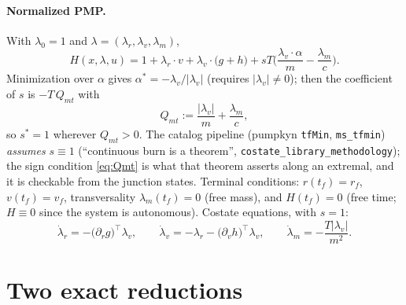 \documentclass[11pt]{article}
\theoremstyle{definition}
\newcommand{\lv}{\lambda_v}
\newcommand{\lr}{\lambda_r}
\newcommand{\lm}{\lambda_m}
\newcommand{\tf}{t_f}
\begin{document}
\paragraph{Normalized PMP.} With $\lambda_0=1$ and $\lambda=(\lr,\lv,\lm)$,
\begin{equation}\label{eq:H}
H(x,\lambda,u)=1+\lr\!\cdot v+\lv\!\cdot\big(g+h\big)+sT\Big(\frac{\lv\!\cdot\alpha}{m}-\frac{\lm}{c}\Big).
\end{equation}
Minimization over $\alpha$ gives $\alpha^*=-\lv/|\lv|$ (requires $|\lv|\neq0$);
then the coefficient of $s$ is $-T\,Q_{mt}$ with
\begin{equation}\label{eq:Qmt}
Q_{mt}:=\frac{|\lv|}{m}+\frac{\lm}{c},
\end{equation}
so $s^*=1$ wherever $Q_{mt}>0$. The catalog pipeline (pumpkyn \texttt{tfMin},
\texttt{ms\_tfmin}) \emph{assumes} $s\equiv1$ (``continuous burn is a
theorem'', \texttt{costate\_library\_methodology}); the sign condition
\eqref{eq:Qmt} is what that theorem asserts along an extremal, and it is
checkable from the junction states. Terminal conditions:
$r(\tf)=r_f$, $v(\tf)=v_f$, transversality $\lm(\tf)=0$ (free mass), and
$H(\tf)=0$ (free time; $H\equiv0$ since the system is autonomous).
Costate equations, with $s=1$:
\begin{equation}\label{eq:costate}
\dot\lr=-\big(\partial_r g\big)^{\!\top}\lv,\qquad
\dot\lv=-\lr-\big(\partial_v h\big)^{\!\top}\lv,\qquad
\dot\lm=-\frac{T|\lv|}{m^2}.
\end{equation}

\section{Two exact reductions}\label{sec:reductions}
\end{document}
